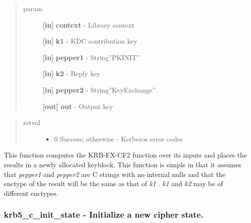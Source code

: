 \documentclass[letterpaper,10pt,english]{sphinxmanual}
\begin{document}
\begin{quote}\begin{description}
\item[{param}] \leavevmode
\textbf{{[}in{]}} \textbf{context} - Library context

\textbf{{[}in{]}} \textbf{k1} - KDC contribution key

\textbf{{[}in{]}} \textbf{pepper1} - String''PKINIT''

\textbf{{[}in{]}} \textbf{k2} - Reply key

\textbf{{[}in{]}} \textbf{pepper2} - String''KeyExchange''

\textbf{{[}out{]}} \textbf{out} - Output key

\end{description}\end{quote}
\begin{quote}\begin{description}
\item[{retval}] \leavevmode\begin{itemize}
\item {} 
0   Success; otherwise - Kerberos error codes

\end{itemize}

\end{description}\end{quote}

This function computes the KRB-FX-CF2 function over its inputs and places the results in a newly allocated keyblock. This function is simple in that it assumes that \emph{pepper1} and \emph{pepper2} are C strings with no internal nulls and that the enctype of the result will be the same as that of \emph{k1} . \emph{k1} and \emph{k2} may be of different enctypes.


\subsubsection{krb5\_c\_init\_state -  Initialize a new cipher state.}
\label{appdev/refs/api/krb5_c_init_state:krb5-c-init-state-initialize-a-new-cipher-state}\label{appdev/refs/api/krb5_c_init_state::doc}

\begin{fulllineitems}
\label{appdev/refs/api/krb5_c_init_state:c.krb5_c_init_state}
\end{fulllineitems}
\end{document}
